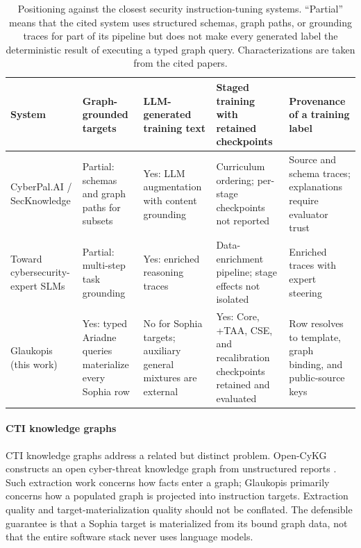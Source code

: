 \documentclass[twocolumn]{svjour3}
\begin{document}
\begin{table}
\centering\footnotesize
\caption{Positioning against the closest security instruction-tuning systems. ``Partial'' means that the cited system uses structured schemas, graph paths, or grounding traces for part of its pipeline but does not make every generated label the deterministic result of executing a typed graph query. Characterizations are taken from the cited papers.}\label{tab:positioning}
\begin{tabularx}{\textwidth}{@{}p{2.6cm}XXXX@{}}
\toprule
System & Graph-grounded targets & LLM-generated training text & Staged training with retained checkpoints & Provenance of a training label \\
\midrule
CyberPal.AI / SecKnowledge \cite{levi2025cyberpal} & Partial: schemas and graph paths for subsets & Yes: LLM augmentation with content grounding & Curriculum ordering; per-stage checkpoints not reported & Source and schema traces; explanations require evaluator trust \\
Toward cybersecurity-expert SLMs \cite{levi2025toward} & Partial: multi-step task grounding & Yes: enriched reasoning traces & Data-enrichment pipeline; stage effects not isolated & Enriched traces with expert steering \\
Glaukopis (this work) & Yes: typed Ariadne queries materialize every Sophia row & No for Sophia targets; auxiliary general mixtures are external & Yes: Core, +TAA, CSE, and recalibration checkpoints retained and evaluated & Row resolves to template, graph binding, and public-source keys \\
\bottomrule
\end{tabularx}
\end{table}

\paragraph{CTI knowledge graphs}
CTI knowledge graphs address a related but distinct problem. Open-CyKG constructs an open cyber-threat knowledge graph from unstructured reports \cite{sarhan2021opencykg}. Such extraction work concerns how facts enter a graph; Glaukopis primarily concerns how a populated graph is projected into instruction targets. Extraction quality and target-materialization quality should not be conflated. The defensible guarantee is that a Sophia target is materialized from its bound graph data, not that the entire software stack never uses language models.
\end{document}

